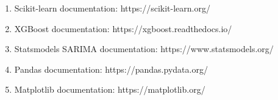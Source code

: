 \documentclass[11pt]{article}
\providecommand{\tightlist}{%
      \setlength{\itemsep}{0pt}\setlength{\parskip}{0pt}}
\begin{document}
\begin{enumerate}
\def\labelenumi{\arabic{enumi}.}
\tightlist
\item
  Scikit-learn documentation: https://scikit-learn.org/
\item
  XGBoost documentation: https://xgboost.readthedocs.io/
\item
  Statsmodels SARIMA documentation: https://www.statsmodels.org/
\item
  Pandas documentation: https://pandas.pydata.org/
\item
  Matplotlib documentation: https://matplotlib.org/
\end{enumerate}


    
    
    
\end{document}
